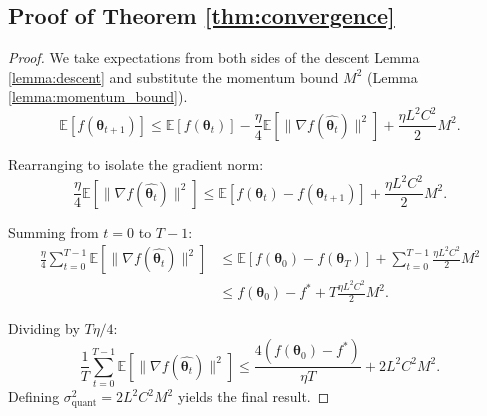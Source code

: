 \documentclass[11pt, a4paper, onecolumn, copyright, goog]{google}
\newcommand{\vtheta}{\boldsymbol{\theta}}
\newcommand{\E}{\mathbb{E}}
\theoremstyle{plain}
\theoremstyle{definition}
\theoremstyle{remark}
\begin{document}
\subsection{Proof of Theorem \ref{thm:convergence}}
\label{proof:thm_convergence}

\begin{proof}
We take expectations from both sides of the descent Lemma \ref{lemma:descent} and substitute the momentum bound $M^2$ (Lemma \ref{lemma:momentum_bound}).
\begin{equation}
    \E \left[ f(\vtheta_{t+1}) \right] \le \E \left[f(\vtheta_t)\right] - \frac{\eta}{4} \E \left[\|\nabla f(\hat{\vtheta_t})\|^2\right] + \frac{\eta L^2 C^2}{2} M^2.
\end{equation}

Rearranging to isolate the gradient norm:
\begin{equation}
    \frac{\eta}{4} \E \left[\|\nabla f(\hat{\vtheta_t})\|^2\right] \le \E \left[f(\vtheta_t) - f(\vtheta_{t+1})\right] + \frac{\eta L^2 C^2}{2} M^2.
\end{equation}

Summing from $t=0$ to $T-1$:
\begin{align}
    \frac{\eta}{4} \sum_{t=0}^{T-1} \E \left[\|\nabla f(\hat{\vtheta_t})\|^2\right] &\le \E \left[f(\vtheta_0) - f(\vtheta_T)\right] + \sum_{t=0}^{T-1} \frac{\eta L^2 C^2}{2} M^2 \nonumber \\
    &\le f(\vtheta_0) - f^* + T \frac{\eta L^2 C^2}{2} M^2.
\end{align}

Dividing by $T \eta / 4$:
\begin{equation}
    \frac{1}{T} \sum_{t=0}^{T-1} \E \left[\|\nabla f(\hat{\vtheta_t})\|^2 \right] \le \frac{4(f(\vtheta_0) - f^*)}{\eta T} + 2L^2 C^2 M^2.
\end{equation}
Defining $\sigma_{\text{quant}}^2 = 2L^2 C^2 M^2$ yields the final result.
\end{proof}
\end{document}
